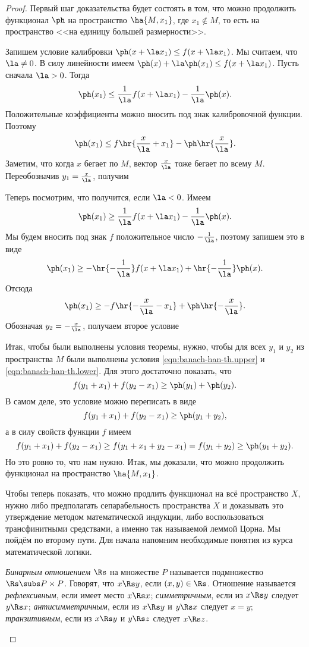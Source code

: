 \documentclass[a4paper]{article}
\begin{document}
\begin{proof}
Первый шаг доказательства будет состоять в том, что можно продолжить функционал $\ph$ на пространство
$\ha{M, x_1}$, где $x_1 \notin M$, то есть на пространство <<на единицу большей размерности>>.

Запишем условие калибровки
$\ph(x + \la x_1) \le f(x + \la x_1)$. Мы считаем, что $\la \neq 0$.
В силу линейности имеем $\ph(x)  + \la\ph(x_1) \le f(x + \la x_1)$.
Пусть сначала $\la > 0$. Тогда
$$\ph(x_1) \le \frac1\la f(x + \la x_1) - \frac1\la\ph(x).$$
Положительные коэффициенты можно вносить под знак калибровочной функции. Поэтому
$$\ph(x_1) \le f\hr{\frac{x}{\la} + x_1} - \ph\hr{\frac{x}{\la}}.$$
Заметим, что когда $x$ бегает по $M$, вектор $\frac{x}{\la}$ тоже бегает по всему $M$.
Переобозначив $y_1 = \frac{x}{\la}$, получим

Теперь посмотрим, что получится, если $\la < 0$. Имеем
$$\ph(x_1) \ge \frac{1}{\la}f(x+\la x_1) -\frac1\la\ph(x).$$
Мы будем вносить под знак $f$ положительное число $-\frac{1}{\la}$, поэтому запишем это в виде
$$\ph(x_1) \ge -\hr{-\frac{1}{\la}}f(x+\la x_1)+ \hr{-\frac1\la}\ph(x).$$
Отсюда
$$\ph(x_1) \ge -f\hr{-\frac{x}{\la}-x_1} + \ph\hr{-\frac{x}{\la}}.$$
Обозначая $y_2 = -\frac{x}{\la}$, получаем второе условие

Итак, чтобы были выполнены условия теоремы, нужно, чтобы для всех $y_1$ и $y_2$ из пространства $M$
были выполнены условия \eqref{eqn:banach-han-th.upper} и \eqref{eqn:banach-han-th.lower}.
Для этого достаточно показать, что
$$f(y_1+x_1) + f(y_2-x_1) \ge \ph(y_1) + \ph(y_2).$$
В самом деле, это условие можно переписать в виде
$$f(y_1+x_1) + f(y_2-x_1) \ge \ph(y_1 + y_2),$$
а в силу свойств функции $f$ имеем
$$f(y_1+x_1) + f(y_2-x_1) \ge f(y_1+x_1+y_2-x_1) = f(y_1+y_2) \ge \ph(y_1 + y_2).$$
Но это ровно то, что нам нужно.
Итак, мы доказали, что можно продолжить функционал на пространство $\ha{M, x_1}$.

Чтобы теперь показать, что можно продлить функционал на всё пространство $X$,
нужно либо предполагать сепарабельность пространства $X$ и доказывать это утверждение
методом математической индукции, либо воспользоваться трансфинитными средствами,
а именно так называемой леммой Цорна. Мы пойдём по второму пути.
Для начала напомним необходимые понятия
из курса математической логики.

\begin{df}
\emph{Бинарным отношением} $\Rs$ на множестве $P$ называется подмножество $\Rs \subs P\times P$. Говорят,
что $x \Rs y$, если $(x,y) \in \Rs$. Отношение называется \emph{рефлексивным}, если имеет место $x\Rs x$;
\emph{симметричным}, если из $x \Rs y$ следует $y \Rs x$; \emph{антисимметричным}, если из $x \Rs y$ и $y \Rs x$ следует $x = y$;
\emph{транзитивным}, если из $x\Rs y$ и $y \Rs z$ следует $x \Rs z$.
\end{df}


\end{proof}
\end{document}
